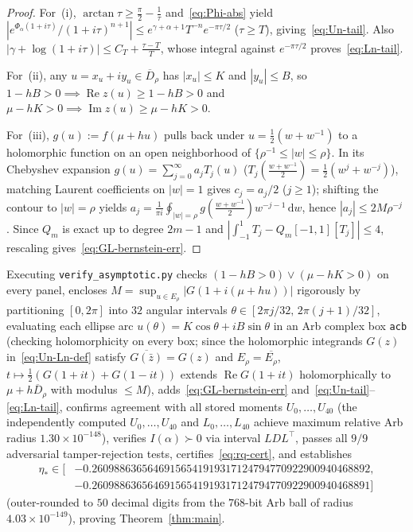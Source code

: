 \documentclass[11pt, reqno]{amsart}
\theoremstyle{remark}
\numberwithin{equation}{section}
\DeclareMathOperator{\re}{Re}
\DeclareMathOperator{\im}{Im}
\newcommand{\dd}{\,\mathrm{d}}
\begin{document}
\begin{proof}
For~(i), $\arctan\tau \ge \frac{\pi}{2} - \frac{1}{\tau}$ and~\eqref{eq:Phi-abs} yield
$|e^{\Phi_\alpha(1+i\tau)}/(1+i\tau)^{n+1}| \le e^{\gamma+\alpha+1} T^{-n} e^{-\pi\tau/2}$ ($\tau \ge T$),
giving~\eqref{eq:Un-tail}. Also $|\gamma+\log(1+i\tau)| \le C_T + \frac{\tau-T}{T}$, whose integral against
$e^{-\pi\tau/2}$ proves~\eqref{eq:Ln-tail}.

For~(ii), any $u = x_u + i y_u \in \overline{D}_\rho$ has $|x_u| \le K$ and $|y_u| \le B$, so
$1 - hB > 0 \implies \re z(u) \ge 1 - hB > 0$ and $\mu - hK > 0 \implies \im z(u) \ge \mu - hK > 0$.

For~(iii), $g(u) := f(\mu+h u)$ pulls back under $u = \frac{1}{2}(w+w^{-1})$ to a holomorphic function
on an open neighborhood of $\{\rho^{-1} \le |w| \le \rho\}$. In its Chebyshev expansion
$g(u) = \sum_{j=0}^\infty a_j T_j(u)$ ($T_j(\frac{w+w^{-1}}{2}) = \frac{1}{2}(w^j+w^{-j})$), matching
Laurent coefficients on $|w| = 1$ gives $c_j = a_j/2$ ($j \ge 1$); shifting the contour to $|w| = \rho$ yields
$a_j = \frac{1}{\pi i}\oint_{|w|=\rho} g(\frac{w+w^{-1}}{2}) w^{-j-1}\dd w$, hence $|a_j| \le 2M\rho^{-j}$ \cite{Trefethen}.
Since $Q_m$ is exact up to degree $2m-1$ and $|\int_{-1}^1 T_j - Q_m[-1,1][T_j]| \le 4$, rescaling gives~\eqref{eq:GL-bernstein-err}.
\end{proof}

Executing \texttt{verify\_asymptotic.py} checks $(1-hB > 0)\lor(\mu-hK > 0)$ on every panel, encloses
$M = \sup_{u \in E_\rho} |G(1+i(\mu+hu))|$ rigorously by partitioning $[0, 2\pi]$ into $32$ angular
intervals $\theta \in [2\pi j/32,\, 2\pi(j+1)/32]$, evaluating each ellipse arc $u(\theta) =
K\cos\theta + i B\sin\theta$ in an Arb complex box \texttt{acb} (checking holomorphicity on every box;
since the holomorphic integrands $G(z)$ in~\eqref{eq:Un-Ln-def} satisfy $\overline{G(\bar{z})} = G(z)$
and $E_\rho = \overline{E_\rho}$, $t \mapsto \frac{1}{2}(G(1+it)+G(1-it))$ extends $\re G(1+it)$
holomorphically to $\mu + h\overline{D}_\rho$ with modulus $\le M$), adds~\eqref{eq:GL-bernstein-err} and~\eqref{eq:Un-tail}--\eqref{eq:Ln-tail},
confirms agreement with all stored moments $U_0,\dots,U_{40}$ (the independently computed
$U_0,\dots,U_{40}$ and $L_0,\dots,L_{40}$ achieve maximum relative Arb radius $1.30 \times 10^{-148}$),
verifies $I(\alpha) \succ 0$ via interval $LDL^\top$, passes all $9/9$ adversarial tamper-rejection tests,
certifies~\eqref{eq:rq-cert}, and establishes
\begin{equation}\label{eq:eta-cert}
\begin{aligned}
\eta_* \in \bigl[&{-0.26098863656469156541919317124794770922900940468892},\\
&{-0.26098863656469156541919317124794770922900940468891}\bigr]
\end{aligned}
\end{equation}
(outer-rounded to $50$ decimal digits from the $768$-bit Arb ball of radius $4.03 \times 10^{-149}$),
proving Theorem~\ref{thm:main}.
\end{document}
